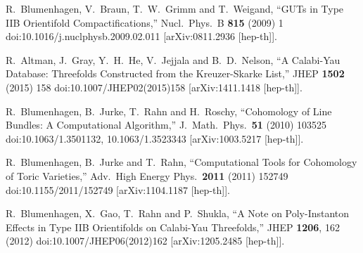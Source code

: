 \documentclass[11pt,a4paper]{article}
\begin{document}
\begin{thebibliography}{99}
  R.~Blumenhagen, V.~Braun, T.~W.~Grimm and T.~Weigand,
  ``GUTs in Type IIB Orientifold Compactifications,''
  Nucl.\ Phys.\ B {\bf 815} (2009) 1
  doi:10.1016/j.nuclphysb.2009.02.011
  [arXiv:0811.2936 [hep-th]].

  R.~Altman, J.~Gray, Y.~H.~He, V.~Jejjala and B.~D.~Nelson,
  ``A Calabi-Yau Database: Threefolds Constructed from the Kreuzer-Skarke List,''
  JHEP {\bf 1502} (2015) 158
  doi:10.1007/JHEP02(2015)158
  [arXiv:1411.1418 [hep-th]].

  R.~Blumenhagen, B.~Jurke, T.~Rahn and H.~Roschy,
  ``Cohomology of Line Bundles: A Computational Algorithm,''
  J.\ Math.\ Phys.\  {\bf 51} (2010) 103525
  doi:10.1063/1.3501132, 10.1063/1.3523343
  [arXiv:1003.5217 [hep-th]].

  R.~Blumenhagen, B.~Jurke and T.~Rahn,
  ``Computational Tools for Cohomology of Toric Varieties,''
  Adv.\ High Energy Phys.\  {\bf 2011} (2011) 152749
  doi:10.1155/2011/152749
  [arXiv:1104.1187 [hep-th]].
  
  R.~Blumenhagen, X.~Gao, T.~Rahn and P.~Shukla,
  ``A Note on Poly-Instanton Effects in Type IIB Orientifolds on Calabi-Yau Threefolds,''
  JHEP {\bf 1206}, 162 (2012)
  doi:10.1007/JHEP06(2012)162
  [arXiv:1205.2485 [hep-th]].

	
\end{thebibliography}
\end{document}
